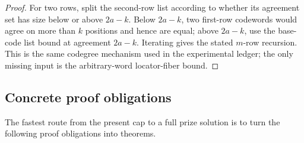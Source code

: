 \documentclass[11pt]{article}
\theoremstyle{definition}
\theoremstyle{remark}
\begin{document}
\begin{proof}
For two rows, split the second-row list according to whether its agreement set
has size below or above $2a-k$.  Below $2a-k$, two first-row codewords would
agree on more than $k$ positions and hence are equal; above $2a-k$, use the
base-code list bound at agreement $2a-k$.  Iterating gives the stated $m$-row
recursion.  This is the same codegree mechanism used in the experimental ledger;
the only missing input is the arbitrary-word locator-fiber bound.
\end{proof}

\subsection{Concrete proof obligations}

The fastest route from the present cap to a full prize solution is to turn the
following proof obligations into theorems.
\end{document}
